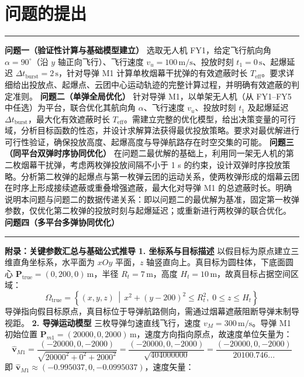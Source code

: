 \documentclass{JXUSTmodeling}
\begin{document}
\section{问题的提出}
\noindent\rule{\textwidth}{0.4pt}
\textbf{问题一（验证性计算与基础模型建立）}
选取无人机 FY1，给定飞行航向角 $\alpha = 90^\circ$（沿 $y$ 轴正向飞行）、飞行速度 $v_u = 100\,\text{m/s}$、投放时刻 $t_1 = 0\,\text{s}$、起爆延迟 $\Delta t_{\text{burst}} = 2\,\text{s}$，针对导弹 M1 计算单枚烟幕干扰弹的有效遮蔽时长 $T_{\text{eff}}$。要求详细给出投放点、起爆点、云团中心运动轨迹的完整计算过程，并明确有效遮蔽的判定准则。
\textbf{问题二（单弹全局优化）}
针对导弹 M1，以单架无人机（从 FY1–FY5 中任选）为平台，联合优化其航向角 $\alpha$、飞行速度 $v_u$、投放时刻 $t_1$ 及起爆延迟 $\Delta t_{\text{burst}}$，最大化有效遮蔽时长 $T_{\text{eff}}$。需建立完整的优化模型，给出决策变量的可行域，分析目标函数的性态，并设计求解算法获得最优投放策略。要求对最优解进行可行性验证，确保投放高度、起爆高度与导弹航路存在时空交集的可能。
\textbf{问题三（同平台双弹时序协同优化）}
在问题二最优解的基础上，利用同一架无人机的第二枚烟幕干扰弹，考虑两枚弹投放间隔不小于 1 s 的约束，设计双弹时序投放策略。分析第二枚弹的起爆点与第一枚弹云团的运动关系，使两枚弹形成的烟幕云团在时序上形成接续遮蔽或重叠增强遮蔽，最大化对导弹 M1 的总遮蔽时长。明确说明本问题与问题二的数据传递关系：即以问题二的最优解为基准，固定第一枚弹参数，仅优化第二枚弹的投放时刻与起爆延迟；或重新进行两枚弹的联合优化。
\textbf{问题四（多平台多弹协同优化）}
\noindent\rule{\textwidth}{0.4pt}
\textbf{附录：关键参数汇总与基础公式推导}
\textbf{1. 坐标系与目标描述}
以假目标为原点建立三维直角坐标系，水平面为 $xOy$ 平面，$z$ 轴竖直向上。真目标为圆柱体，下底面圆心 $\mathbf{P}_{\text{true}} = (0, 200, 0)\,\text{m}$，半径 $R_t = 7\,\text{m}$，高度 $H_t = 10\,\text{m}$，故真目标占据空间区域：
\begin{equation}
\Omega_{\text{true}} = \left\{(x,y,z)\,\middle|\,x^2+(y-200)^2\leq R_t^2,\; 0\leq z\leq H_t\right\} \tag{1}
\end{equation}
导弹指向假目标原点，真目标位于导弹航路侧向，需通过烟幕遮蔽阻断导弹末制导视距。
\textbf{2. 导弹运动模型}
三枚导弹匀速直线飞行，速度 $v_M = 300\,\text{m/s}$。导弹 M1 初始位置 $\mathbf{P}_{m1} = (20000, 0, 2000)\,\text{m}$，速度方向指向原点，故速度单位矢量为：
\begin{equation}
\hat{\mathbf{v}}_{M1} = \frac{(-20000, 0, -2000)}{\sqrt{20000^2+0^2+2000^2}} = \frac{(-20000, 0, -2000)}{\sqrt{404000000}} = \frac{(-20000, 0, -2000)}{20100.746...} \tag{2}
\end{equation}
即 $\hat{\mathbf{v}}_{M1} \approx (-0.995037, 0, -0.0995037)$，速度矢量：
\end{document}
